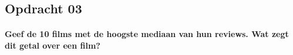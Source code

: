 \subsection{Opdracht 03}

\paragraph{
Geef de 10 films met de hoogste mediaan van hun reviews. Wat zegt dit getal over een film?
}



